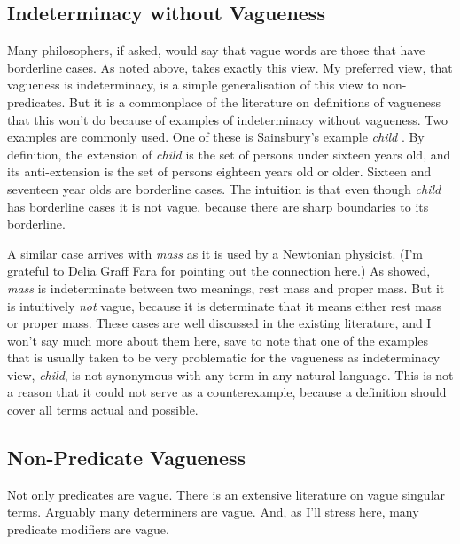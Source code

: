 \subsection{Indeterminacy without Vagueness}

Many philosophers, if asked, would say that vague words are those that have borderline cases. As noted above, \citet{Fine1975a} takes exactly this view. My preferred view, that vagueness is indeterminacy, is a simple generalisation of this view to non-predicates. But it is a commonplace of the literature on definitions of vagueness that this won't do because of examples of indeterminacy without vagueness. Two examples are commonly used. One of these is Sainsbury's example \textit{child} \citep{Sainsbury1991}. By definition, the extension of \textit{child} is the set of persons under sixteen years old, and its anti-extension is the set of persons eighteen years old or older. Sixteen and seventeen year olds are borderline cases. The intuition is that even though \textit{child} has borderline cases it is not vague, because there are sharp boundaries to its borderline. 

A similar case arrives with \textit{mass} as it is used by a Newtonian physicist. (I'm grateful to Delia Graff Fara for pointing out the connection here.) As \citet{Field1973} showed, \textit{mass }is indeterminate between two meanings, rest mass and proper mass. But it is intuitively \textit{not} vague, because it is determinate that it means either rest mass or proper mass. These cases are well discussed in the existing literature, and I won't say much more about them here, save to note that one of the examples that is usually taken to be very problematic for the vagueness as indeterminacy view, \textit{child}, is not synonymous with any term in any natural language. This is not a reason that it could not serve as a counterexample, because a definition should cover all terms actual and possible.


\subsection{Non-Predicate Vagueness}

Not only predicates are vague. There is an extensive literature on vague singular terms. Arguably many determiners are vague. And, as I'll stress here, many predicate modifiers are vague. 

